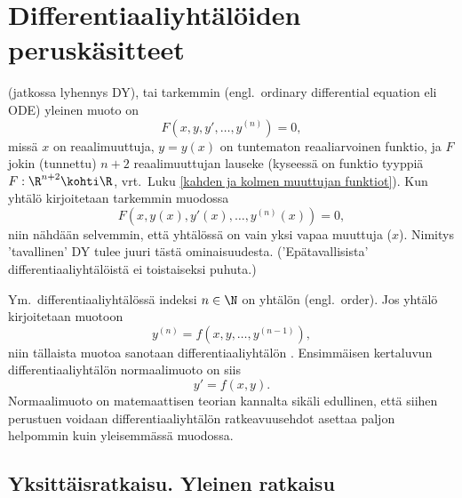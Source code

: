\section{Differentiaaliyhtälöiden peruskäsitteet} \label{DY-käsitteet}
\alku

 (jatkossa lyhennys DY), tai tarkemmin 
 (engl.\ ordinary differential equation eli ODE) yleinen
muoto on 
\[
F(x,y,y',\ldots,y^{(n)})=0,
\]
missä $x$ on reaalimuuttuja, $y=y(x)$ on tuntematon reaaliarvoinen funktio, ja $F$ jokin
(tunnettu) $n+2$ reaalimuuttujan lauseke (kyseessä on funktio tyyppiä $F:\R^{n+2}\kohti\R$, 
vrt.\ Luku \ref{kahden ja kolmen muuttujan funktiot}). Kun yhtälö kirjoitetaan tarkemmin
muodossa
\[
F(x,y(x),y'(x),\ldots,y^{(n)}(x))=0,
\]
niin nähdään selvemmin, että yhtälössä on vain yksi vapaa muuttuja ($x$). Nimitys 'tavallinen'
DY tulee juuri tästä ominaisuudesta. ('Epätavallisista' differentiaaliyhtälöistä ei
toistaiseksi puhuta.)

Ym.\ differentiaaliyhtälössä indeksi $n\in\N$ on yhtälön
%
 (engl.\ order). Jos 
yhtälö kirjoitetaan muotoon
\[
y^{(n)}=f(x,y,\ldots,y^{(n-1)}),
\]
niin tällaista muotoa sanotaan differentiaaliyhtälön
. Ensimmäisen
kertaluvun differentiaaliyhtälön normaalimuoto on siis
\[
y'=f(x,y).
\]
Normaalimuoto on matemaattisen teorian kannalta sikäli edullinen, että siihen perustuen voidaan
differentiaaliyhtälön ratkeavuusehdot asettaa paljon helpommin kuin yleisemmässä muodossa.

\subsection*{Yksittäisratkaisu.  Yleinen ratkaisu}

